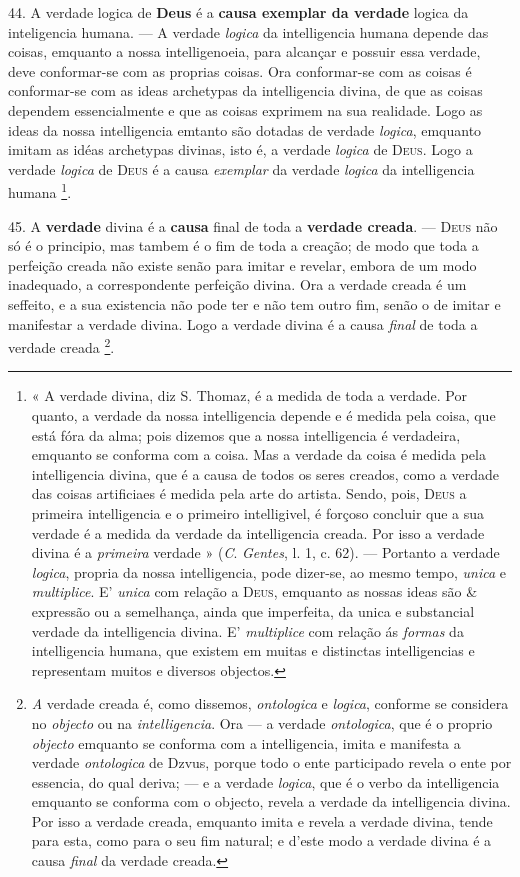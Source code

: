 44. A verdade logica de \textbf{Deus} é a \textbf{causa exemplar da verdade} logica da inteligencia humana. --- A verdade \emph{logica} da intelligencia humana depende das coisas, emquanto a nossa intelligenoeia, para alcançar e possuir essa verdade, deve conformar-se com as proprias coisas. Ora conformar-se com as coisas é conformar-se com as ideas archetypas da intelligencia divina, de que as coisas dependem essencialmente e que as coisas exprimem na sua realidade. Logo as ideas da nossa intelligencia emtanto   são dotadas de verdade \emph{logica}, emquanto imitam as idéas archetypas divinas, isto é, a verdade \emph{logica} de \textsc{Deus}. Logo a verdade \emph{logica} de \textsc{Deus} é a causa \emph{exemplar} da verdade \emph{logica} da intelligencia humana \footnote{« A verdade divina, diz S. Thomaz, é a medida de toda a verdade. Por quanto, a verdade da nossa intelligencia depende e é medida pela coisa, que está fóra da alma; pois dizemos que a nossa intelligencia é verdadeira, emquanto se conforma com a coisa. Mas a verdade da coisa é medida pela intelligencia divina, que é a causa de todos os seres creados, como a verdade das coisas artificiaes é medida pela arte do artista. Sendo, pois, \textsc{Deus} a primeira intelligencia e o primeiro intelligivel, é forçoso concluir que a sua verdade é a medida da verdade da intelligencia creada. Por isso a verdade divina é a \emph{primeira} verdade » (\emph{C}. \emph{Gentes}, l. 1, c. 62). --- Portanto a verdade \emph{logica}, propria da nossa intelligencia, pode dizer-se, ao mesmo tempo, \emph{unica} e \emph{multiplice}. E' \emph{unica} com relação a \textsc{Deus}, emquanto as nossas ideas são \& expressão ou a semelhança, ainda que imperfeita, da unica e substancial verdade da intelligencia divina. E' \emph{multiplice} com relação ás \emph{formas} da intelligencia humana, que existem em muitas e distinctas intelligencias e representam muitos e diversos objectos.}.

45. A \textbf{verdade} divina é a \textbf{causa} final de toda a \textbf{verdade creada}. --- \textsc{Deus} não só é o principio, mas tambem é o fim de toda a creação; de modo que toda a perfeição creada não existe senão para imitar e revelar, embora de um modo inadequado, a correspondente perfeição divina. Ora a verdade creada é um seffeito, e a sua existencia não pode ter e não tem outro fim, senão o de imitar e manifestar a verdade divina. Logo a verdade divina é a causa \emph{final} de toda a verdade creada \footnote{\emph{A} verdade creada é, como dissemos, \emph{ontologica} e \emph{logica}, conforme se considera no \emph{objecto} ou na \emph{intelligencia}. Ora --- a verdade \emph{ontologica}, que é o proprio \emph{objecto} emquanto se conforma com a intelligencia, imita e manifesta a verdade \emph{ontologica} de Dzvus, porque todo o ente participado revela o ente por essencia, do qual deriva; --- e a verdade \emph{logica}, que é o verbo da intelligencia emquanto se conforma com o objecto, revela a verdade da intelligencia divina. Por isso a verdade creada, emquanto imita e revela a verdade divina, tende para esta, como para o seu fim natural; e d'este modo a verdade divina é a causa \emph{final} da verdade creada.}.

